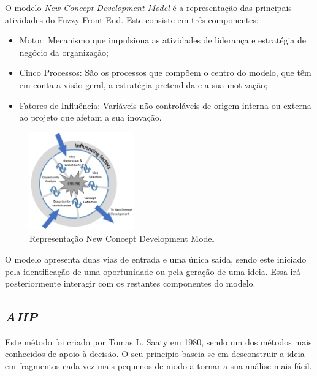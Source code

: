 O modelo \emph{New Concept Development Model} é a representação das principais atividades do Fuzzy Front End. Este consiste em três componentes:

\begin{itemize}

\item Motor: Mecanismo que impulsiona as atividades de liderança e estratégia de negócio da organização;

\item Cinco Processos: São os processos que compõem o centro do modelo, que têm em conta a visão geral, a estratégia pretendida e a sua motivação;

\item Fatores de Influência: Variáveis não controláveis de origem interna ou externa ao projeto que afetam a sua inovação.

\end{itemize}

\begin{figure}[H]
    \begin{center}
    \includegraphics[width=0.4\textwidth]{figures/The-New-Concept-Development-NCD-model-Koen-et-al-2001.png}
    \caption{Representação New Concept Development Model}
    \end{center}
\end{figure}

O modelo apresenta duas vias de entrada e uma única saída, sendo este iniciado pela identificação de uma oportunidade ou pela geração de uma ideia. Essa irá posteriormente interagir com os restantes componentes do modelo.

\subsection{\emph{\acrfull{AHP}}\label{section_AHP}}

Este método foi criado por Tomas L. Saaty em 1980, sendo um dos métodos mais conhecidos de apoio à decisão. O seu principio baseia-se em desconstruir a ideia em fragmentos cada vez mais pequenos de modo a tornar a sua análise mais fácil.

